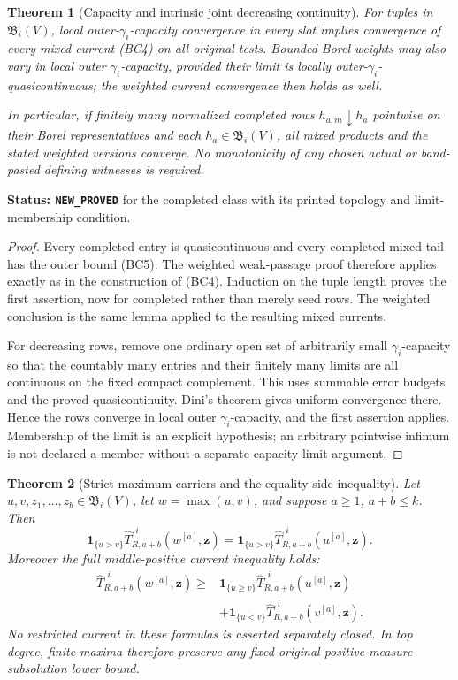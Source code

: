 \documentclass[11pt,a4paper]{article}
\numberwithin{equation}{section}
\newtheorem{theorem}{Theorem}[section]
\theoremstyle{definition}
\theoremstyle{remark}
\begin{document}
\begin{theorem}[Capacity and intrinsic joint decreasing continuity]
\label{thm:r12-completed-band-continuity}
For tuples in $\mathfrak B_i(V)$, local outer-$\gamma_i$-capacity
convergence in every slot implies convergence of every mixed
current (BC4) on all original tests. Bounded Borel weights may
also vary in local outer $\gamma_i$-capacity, provided their
limit is locally outer-$\gamma_i$-quasicontinuous; the weighted
current convergence then holds as well.

In particular, if finitely many normalized completed rows
$h_{a,m}\downarrow h_a$ pointwise on their Borel representatives
and each $h_a\in\mathfrak B_i(V)$, all mixed products and
the stated weighted versions converge. No monotonicity of any
chosen actual or band-pasted defining witnesses is required.
\end{theorem}

\noindent\textbf{Status: \texttt{NEW\_PROVED}} for the completed
class with its printed topology and limit-membership condition.

\begin{proof}
Every completed entry is quasicontinuous and every completed
mixed tail has the outer bound (BC5). The weighted weak-passage
proof therefore applies exactly as in the construction of (BC4).
Induction on the tuple length proves the first assertion, now
for completed rather than merely seed rows. The weighted
conclusion is the same lemma applied to the resulting mixed
currents.

For decreasing rows, remove one ordinary open set of arbitrarily
small $\gamma_i$-capacity so that the countably many entries
and their finitely many limits are all continuous on the fixed
compact complement. This uses summable error budgets and the
proved quasicontinuity. Dini's theorem gives uniform convergence
there. Hence the rows converge in local outer $\gamma_i$-capacity,
and the first assertion applies. Membership of the limit is an
explicit hypothesis; an arbitrary pointwise infimum is not
declared a member without a separate capacity-limit argument.
\end{proof}

\begin{theorem}[Strict maximum carriers and the equality-side inequality]
\label{thm:r12-completed-band-maximum-carriers}
Let $u,v,z_1,\ldots,z_b\in\mathfrak B_i(V)$, let
$w=\max(u,v)$, and suppose $a\geq1$, $a+b\leq k$. Then
\[
 \mathbf1_{\{u>v\}}\widehat T^{,i}_{R,a+b}(w^{[a]},\mathbf z)
    =\mathbf1_{\{u>v\}}\widehat T^{,i}_{R,a+b}(u^{[a]},\mathbf z).
 \tag{BC8}
\]
Moreover the full middle-positive current inequality holds:
\[
 \begin{split}
 \widehat T^{,i}_{R,a+b}(w^{[a]},\mathbf z)
 \geq{}&\mathbf1_{\{u\geq v\}}
                    \widehat T^{,i}_{R,a+b}(u^{[a]},\mathbf z)\\
       &+\mathbf1_{\{u<v\}}
                    \widehat T^{,i}_{R,a+b}(v^{[a]},\mathbf z).
 \end{split}
 \tag{BC9}
\]
No restricted current in these formulas is asserted separately
closed. In top degree, finite maxima therefore preserve any
fixed original positive-measure subsolution lower bound.
\end{theorem}
\end{document}

